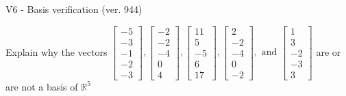 \begin{exercise}
  \begin{exerciseTitle}V6 - Basis verification (ver. 944)\end{exerciseTitle}
  \begin{exerciseStatement}
    Explain why the vectors \(\left[\begin{array}{r}
-5 \\
-3 \\
-1 \\
-2 \\
-3
\end{array}\right] , \left[\begin{array}{r}
-2 \\
-2 \\
-4 \\
0 \\
4
\end{array}\right] , \left[\begin{array}{r}
11 \\
5 \\
-5 \\
6 \\
17
\end{array}\right] , \left[\begin{array}{r}
2 \\
-2 \\
-4 \\
0 \\
-2
\end{array}\right] , \text{ and } \left[\begin{array}{r}
1 \\
3 \\
-2 \\
-3 \\
3
\end{array}\right]\) are or are not a basis of \(\mathbb{R}^5\)	



\end{exerciseStatement}
\end{exercise}
